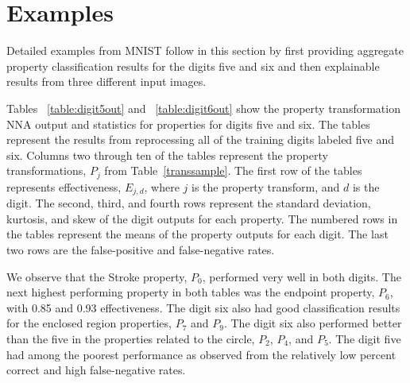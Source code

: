 \documentclass[conference]{IEEEtran}
\begin{document}
\section{Examples}

Detailed examples from MNIST follow in this section by first providing aggregate property classification results for the digits five and six and then explainable results from three different input images.

Tables ~\ref{table:digit5out} and ~\ref{table:digit6out} show the property transformation NNA output and statistics for properties for digits five and six.  The tables represent the results from reprocessing all of the training digits labeled five and six.  Columns two through ten of the tables represent the property transformations, $P_j$ from Table~\ref{transsample}.  The first row of the tables represents effectiveness, $E_{j,d}$, where $j$ is the property transform, and $d$ is the digit.  The second, third, and fourth rows represent the standard deviation, kurtosis, and skew of the digit outputs for each property.  The numbered rows in the tables represent the means of the property outputs for each digit.  The last two rows are the false-positive and false-negative rates.

We observe that the Stroke property, $P_0$, performed very well in both digits.  The next highest performing property in both tables was the endpoint property, $P_6$, with 0.85 and 0.93 effectiveness.  The digit six also had good classification results for the enclosed region properties, $P_7$ and $P_9$.  The digit six also performed better than the five in the properties related to the circle, $P_2$, $P_4$, and $P_5$.  The digit five had among the poorest performance as observed from the relatively low percent correct and high false-negative rates.
\end{document}
